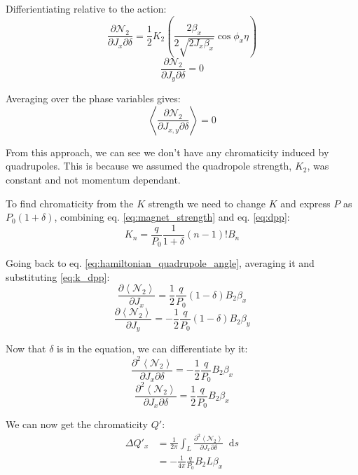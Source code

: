 \documentclass[12pt,a4,]{article}
\numberwithin{equation}{subsection}
\newcommand*\diff{\mathop{}\!\mathrm{d}}
\begin{document}
Differientiating relative to the action:
\begin{equation}\frac{\partial \mathcal{N_2}}{\partial J_x \partial \delta} =  \frac{1}{2} K_2 \left (\frac{2 \beta_x}{2 \sqrt{2 J_x \beta_x}} \cos \phi_x \eta \right) \end{equation}
\begin{equation}\frac{\partial \mathcal{N_2}}{\partial J_y \partial \delta} = 0\end{equation}

Averaging over the phase variables gives:
\begin{equation}\left< \frac{\partial \mathcal{N_2}}{\partial J_{x,y} \partial \delta} \right> = 0\end{equation}

From this approach, we can see we don't have any chromaticity induced by
quadrupoles. This is because we assumed the quadropole strength,
\(K_2\), was constant and not momentum dependant.

To find chromaticity from the \(K\) strength we need to change \(K\) and
express \(P\) as \(P_0(1 + \delta)\), combining eq.
\ref{eq:magnet_strength} and eq. \ref{eq:dpp}:
\begin{equation}K_n = \frac{q}{P_0} \frac{1}{1 + \delta} (n - 1)! B_n\label{eq:k_dpp}\end{equation}

Going back to eq. \ref{eq:hamiltonian_quadrupole_angle}, averaging it
and substituting \ref{eq:k_dpp}:
\begin{equation}\frac{\partial \left< \mathcal{N_2} \right>}{\partial J_x} = \frac{1}{2} \frac{q}{P_0} (1 - \delta) B_2 \beta_x\end{equation}
\begin{equation}\frac{\partial \left< \mathcal{N_2} \right>}{\partial J_y} = - \frac{1}{2} \frac{q}{P_0} (1 - \delta) B_2 \beta_y\end{equation}

Now that \(\delta\) is in the equation, we can differentiate by it:
\begin{equation}\frac{\partial^2 \left< \mathcal{N_2} \right>}{\partial J_x \partial \delta}  = - \frac{1}{2} \frac{q}{P_0} B_2 \beta_x\end{equation}
\begin{equation}\frac{\partial^2 \left< \mathcal{N_2} \right>}{\partial J_x \partial \delta}  = \frac{1}{2} \frac{q}{P_0} B_2 \beta_x\end{equation}

We can now get the chromaticity \(Q'\): \begin{equation}\begin{aligned}
\Delta Q'_x &= \frac{1}{2\pi} \int_L \frac{\partial^2 \left< \mathcal{N_2} \right> }{\partial J_x \partial \delta} \diff s \\
  & = - \frac{1}{4 \pi} \frac{q}{P_0} B_2 L \beta_x
\end{aligned}\end{equation}
\end{document}
